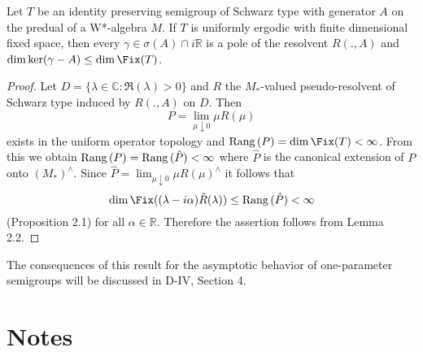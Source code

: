 \begin{theorem}\label{thm:d3-2-5}
Let $T$ be an identity preserving semigroup of Schwarz type with generator $A$ on the predual of a W*-algebra $M$.
If $T$ is uniformly ergodic with finite dimensional fixed space, then every $\gamma \in \sigma(A) \cap i\mathbb{R}$ is a pole of the resolvent $R(.,A)$ and $\dim \ker(\gamma - A) \leq \dim \Fix(T)$.
\end{theorem}

\begin{proof}
Let $D = \{\lambda \in \mathbb{C} : \Re(\lambda) > 0\}$ and $R$ the $M_{*}$-valued pseudo-resolvent of Schwarz type induced by $R(.,A)$ on $D$.
Then
\[
P = \lim_{\mu \downarrow 0}\mu R(\mu)
\]
exists in the uniform operator topology and $\rank(P) = \dim \Fix(T) < \infty$.
From this we obtain $\mathrm{Rang}\,(P) = \mathrm{Rang}\,(\hat{P}) < \infty$ where $\hat{P}$ is the canonical extension of $P$ onto $(M_{*})^{\wedge}$.
Since $\hat{P} = \lim_{\mu \downarrow 0} \mu R(\mu)^{\wedge}$ it follows that
\[
\dim \Fix((\lambda - i\alpha)\hat{R}(\lambda)) \leq \rank(\hat{P}) < \infty
\]
(Proposition 2.1) for all $\alpha \in \mathbb{R}$.
Therefore the assertion follows from Lemma 2.2.
\end{proof}

The consequences of this result for the asymptotic behavior of one-parameter semigroups will be discussed in D-IV, Section 4.

\section*{Notes}\label{notes:d3-notes}

